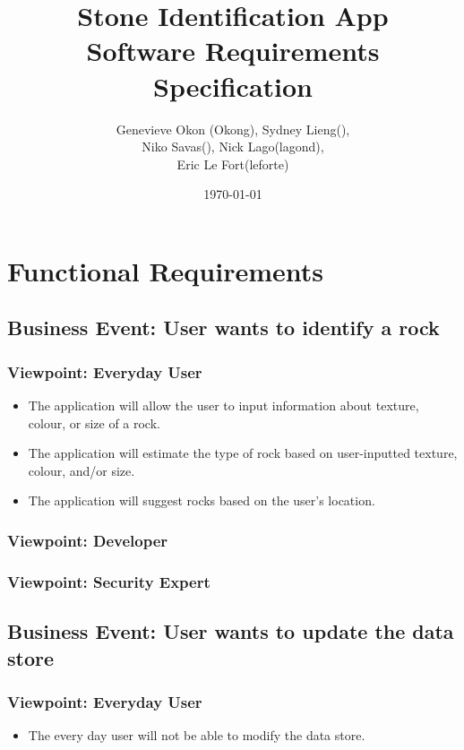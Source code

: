 \documentclass[titlepage]{article}
\begin{document}
\title{Stone Identification App \\
  Software Requirements Specification}
\author{Genevieve Okon (Okong), Sydney Lieng(),\\
  Niko Savas(), Nick Lago(lagond),\\
  Eric Le Fort(leforte)}
\date{\today}
\maketitle

\section{Functional Requirements}
\subsection {Business Event: User wants to identify a rock}
  \subsubsection {Viewpoint: Everyday User}
    \begin{itemize}
      \item The application will allow the user to input information about texture, colour, or size of a rock.
      \item The application will estimate the type of rock based on user-inputted texture, colour, and/or size.
      \item The application will suggest rocks based on the user's location.
    \end{itemize}
  \subsubsection {Viewpoint: Developer}
  \subsubsection {Viewpoint: Security Expert}
\subsection {Business Event: User wants to update the data store}
  \subsubsection {Viewpoint: Everyday User}
    \begin{itemize}
      \item The every day user will not be able to modify the data store.
    \end{itemize}
\end{document}
